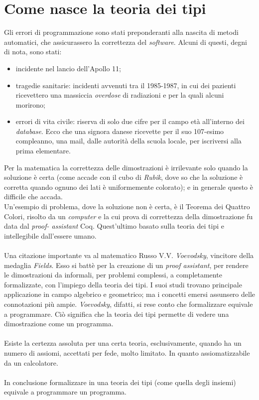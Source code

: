 \section{Come nasce la teoria dei tipi}
\label{sec:come-nasce}
Gli errori di programmazione sono stati preponderanti alla nascita di metodi automatici, che assicurassero la correttezza del \textit{software}. Alcuni di questi, degni di nota, sono stati:
\begin{itemize}
\item incidente nel lancio dell'Apollo 11;
\item tragedie sanitarie: incidenti avvenuti tra il 1985-1987, in cui dei pazienti ricevettero una massiccia \textit{overdose} di radiazioni e per la quali alcuni morirono;
\item errori di vita civile: riserva di solo due cifre per il campo et\`a all'interno dei \textit{database}. Ecco che una signora danese ricevette per il suo 107-esimo compleanno, una mail, dalle autorit\`a della scuola locale, per iscriversi alla prima elementare.
\end{itemize}
\noindent 
Per la matematica la correttezza delle dimostrazioni \`e irrilevante solo quando la soluzione \`e certa (come accade con il cubo di \textit{Rubik}, dove so che la soluzione \`e corretta quando ognuno dei lati \`e uniformemente colorato); e in generale questo \`e difficile che accada.\\
Un'esempio di problema, dove la soluzione non \`e certa, \`e il Teorema dei Quattro Colori, risolto da un \textit{computer} e la cui prova di correttezza della dimostrazione fu data dal \textit{proof- assistant} Coq. Quest'ultimo basato sulla teoria dei tipi e intellegibile dall'essere umano.\\\\
Una citazione importante va al matematico Russo V.V. \textit{Voevodsky}, vincitore della medaglia \textit{ Fields}. Esso si batt\`e per la creazione di un \textit{proof assistant}, per rendere le dimostrazioni da informali, per problemi complessi, a completamente formalizzate, con l'impiego della teoria dei tipi. I suoi studi trovano principale applicazione in campo algebrico e geometrico; ma i concetti emersi assunsero delle connotazioni pi\`u ampie. \textit{Voevodsky}, difatti, si rese conto che formalizzare equivale a programmare. Ci\`o significa che la teoria dei tipi permette di vedere una dimostrazione come un programma.
\\\\
Esiste la certezza assoluta per una certa teoria, esclusivamente, quando ha un numero di assiomi, accettati per fede, molto limitato. In quanto assiomatizzabile da un calcolatore.
\\\\
In conclusione formalizzare in una teoria dei tipi (come quella degli insiemi) equivale a programmare un programma.

